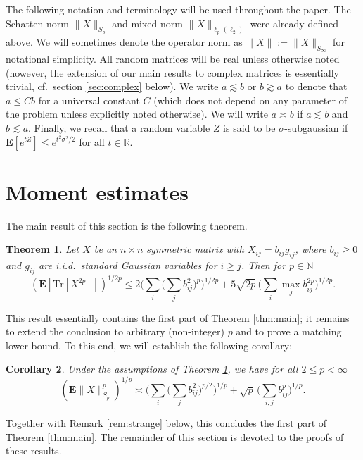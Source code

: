 \documentclass[10pt,reqno]{amsart}
\newtheorem{thm}{Theorem}[section]
\newtheorem{cor}[thm]{Corollary}
\theoremstyle{definition}
\numberwithin{equation}{section}
\numberwithin{figure}{section}
\numberwithin{table}{section}
\begin{document}
The following notation and terminology will be used throughout the paper. 
The Schatten norm $\|X\|_{S_p}$ and mixed norm $\|X\|_{\ell_p(\ell_2)}$ 
were already defined above. We will sometimes denote the operator norm as 
$\|X\|:=\|X\|_{S_\infty}$ for notational simplicity. All random matrices 
will be real unless otherwise noted (however, the extension of our main 
results to complex matrices is essentially trivial, cf.\ section 
\ref{sec:complex} below). We write $a\lesssim 
b$ or $b\gtrsim a$ to denote that $a\le Cb$ for a universal constant $C$ 
(which does not depend on any parameter of the problem unless explicitly 
noted otherwise). We will write $a\asymp b$ if $a\lesssim b$ and 
$b\lesssim a$. Finally, we recall that a random variable $Z$ is said 
to be $\sigma$-subgaussian if $\mathbf{E}[e^{tZ}] \le e^{t^2\sigma^2/2}$ 
for all $t\in\mathbb{R}$.


\section{Moment estimates}
\label{sec:moment}

The main result of this section is the following theorem.

\begin{thm}
\label{thm:moment}
Let $X$ be an $n\times n$ symmetric matrix with 
$X_{ij}=b_{ij}g_{ij}$, where $b_{ij}\ge 0$ and $g_{ij}$ are i.i.d.\ 
standard Gaussian variables for $i\ge j$. Then for $p\in\mathbb{N}$
$$
	(\mathbf{E}[\mathrm{Tr}[X^{2p}]])^{1/2p} \le
	2\Bigg(\sum_i\Bigg(\sum_j b_{ij}^2\Bigg)^p\Bigg)^{1/2p}
	+ 5\sqrt{2p}\,\Bigg(\sum_i \max_j b_{ij}^{2p}\Bigg)^{1/2p}.
$$
\end{thm}

This result essentially contains the first part of Theorem \ref{thm:main}; 
it remains to extend the conclusion to arbitrary (non-integer) $p$ and to 
prove a matching lower bound. To this end, we will establish the following 
corollary:

\begin{cor}
\label{cor:moment}
Under the assumptions of Theorem \ref{thm:moment}, we have
for all $2\le p<\infty$
$$
	(\mathbf{E}\|X\|_{S_p}^p)^{1/p} \asymp
	\Bigg(\sum_i\Bigg(\sum_j b_{ij}^2\Bigg)^{p/2}\Bigg)^{1/p}
	+ \sqrt{p}\,\Bigg(\sum_{i,j} b_{ij}^{p}\Bigg)^{1/p}.
$$
\end{cor}

Together with Remark \ref{rem:strange} below, this concludes the first
part of Theorem \ref{thm:main}.
The remainder of this section is devoted to the proofs of these results.
\end{document}
